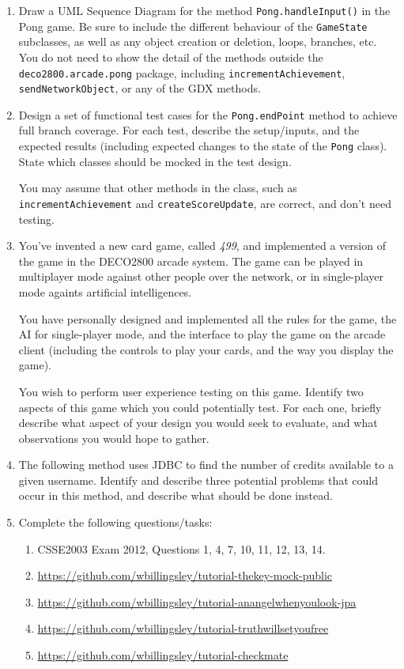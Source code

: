 \documentclass[a4paper,11pt]{article}
\begin{document}
\begin{enumerate}
\item
Draw a UML Sequence Diagram for the method
{\tt Pong.handleInput()} in the Pong game.
Be sure to include the different behaviour of the {\tt GameState} subclasses,
as well as any object creation or deletion, loops, branches, etc.
You do not need to show the detail of the methods outside the
{\tt deco2800.arcade.pong} package, including
{\tt incrementAchievement}, {\tt sendNetworkObject}, or any of the GDX methods.

\item
Design a set of functional test cases for the {\tt Pong.endPoint} method to
achieve full branch coverage. For each test, describe the setup/inputs, and
the expected results (including expected changes to the state of the {\tt Pong}
class). State which classes should be mocked in the test design.

You may assume that other methods in the class, such as
{\tt incrementAchievement} and {\tt createScoreUpdate}, are correct, and don't
need testing.

\item
You've invented a new card game, called
{\em 499}, and implemented a version of the game in the DECO2800
arcade system. The game can be played in multiplayer mode against other people
over the network, or in single-player mode againts artificial intelligences.

You have personally designed and implemented all the rules for the game, the
AI for single-player mode, and the interface to play the game on the
arcade client (including the controls to play your cards, and the way you
display the game).

You wish to perform user experience testing on this game. Identify two aspects
of this game which you could potentially test. For each one, briefly describe
what aspect of your design you would seek to evaluate, and what observations
you would hope to gather.

\item
The following method uses JDBC to find the number of credits available to a
given username. Identify and describe three potential problems that could occur
in this method, and describe what should be done instead.



\item
Complete the following questions/tasks:
\begin{enumerate}
\item
CSSE2003 Exam 2012, Questions 1, 4, 7, 10, 11, 12, 13, 14.
\item
\url{https://github.com/wbillingsley/tutorial-thekey-mock-public}
\item
\url{https://github.com/wbillingsley/tutorial-anangelwhenyoulook-jpa}
\item
\url{https://github.com/wbillingsley/tutorial-truthwillsetyoufree}
\item
\url{https://github.com/wbillingsley/tutorial-checkmate}
\end{enumerate}

\end{enumerate}
\end{document}

